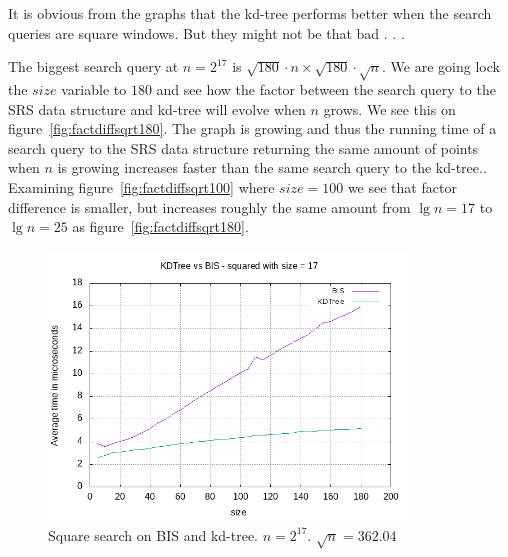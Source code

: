 It is obvious from the graphs that the kd-tree performs better when the search queries are square windows. But they might not be that bad . . . 

The biggest search query at $n = 2^{17}$ is $\sqrt{180}\cdot{n} \times \sqrt{180}\cdot\sqrt{n}$. We are going lock the $size$ variable to $180$ and see how the factor between the search query to the SRS data structure and kd-tree will evolve when $n$ grows. We see this on figure~\ref{fig:factdiffsqrt180}. The graph is growing and thus the running time of a search query to the SRS data structure returning the same amount of points when $n$ is growing increases faster than the same search query to the kd-tree.. Examining figure~\ref{fig:factdiffsqrt100} where $size = 100$ we see that factor difference is smaller, but increases roughly the same amount from $\lg n = 17$ to $\lg n = 25$ as figure~\ref{fig:factdiffsqrt180}. 




\begin{figure}[h]
    \centering
    \includegraphics[width = 0.85\textwidth]{pictures/analysis/sqrt_17.png}
    \caption{Square search on BIS and kd-tree. $n=2^{17}$. $\sqrt{n} = 362.04$}\label{fig:sqrt_17}
\end{figure}


